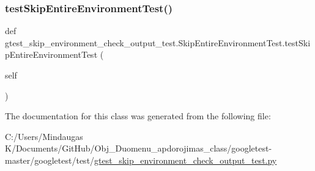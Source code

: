 \subsubsection{\texorpdfstring{testSkipEntireEnvironmentTest()}{testSkipEntireEnvironmentTest()}}
{\footnotesize\ttfamily def gtest\+\_\+skip\+\_\+environment\+\_\+check\+\_\+output\+\_\+test.\+Skip\+Entire\+Environment\+Test.\+test\+Skip\+Entire\+Environment\+Test (\begin{DoxyParamCaption}\item[{}]{self }\end{DoxyParamCaption})}



The documentation for this class was generated from the following file\+:\begin{DoxyCompactItemize}
\item 
C\+:/\+Users/\+Mindaugas K/\+Documents/\+Git\+Hub/\+Obj\+\_\+\+Duomenu\+\_\+apdorojimas\+\_\+class/googletest-\/master/googletest/test/\mbox{\hyperlink{googletest-master_2googletest_2test_2gtest__skip__environment__check__output__test_8py}{gtest\+\_\+skip\+\_\+environment\+\_\+check\+\_\+output\+\_\+test.\+py}}\end{DoxyCompactItemize}
